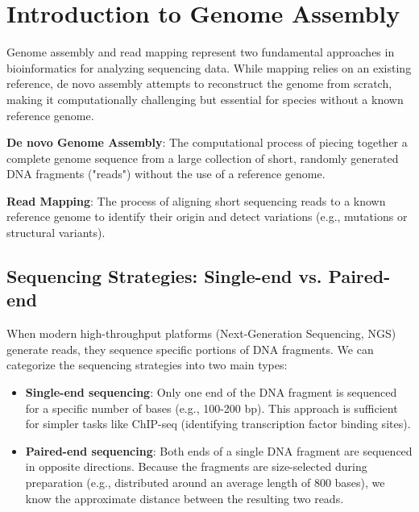 


\section{Introduction to Genome Assembly}
Genome assembly and read mapping represent two fundamental approaches in bioinformatics for analyzing sequencing data. While mapping relies on an existing reference, de novo assembly attempts to reconstruct the genome from scratch, making it computationally challenging but essential for species without a known reference genome. 

\begin{important}
    \textbf{De novo Genome Assembly}: The computational process of piecing together a complete genome sequence from a large collection of short, randomly generated DNA fragments ("reads") without the use of a reference genome.
\end{important}

\begin{important}
    \textbf{Read Mapping}: The process of aligning short sequencing reads to a known reference genome to identify their origin and detect variations (e.g., mutations or structural variants).
\end{important}

\subsection{Sequencing Strategies: Single-end vs. Paired-end}
When modern high-throughput platforms (Next-Generation Sequencing, NGS) generate reads, they sequence specific portions of DNA fragments. We can categorize the sequencing strategies into two main types:

\begin{itemize}
    \item \textbf{Single-end sequencing}: Only one end of the DNA fragment is sequenced for a specific number of bases (e.g., 100-200 bp). This approach is sufficient for simpler tasks like ChIP-seq (identifying transcription factor binding sites).
    \item \textbf{Paired-end sequencing}: Both ends of a single DNA fragment are sequenced in opposite directions. Because the fragments are size-selected during preparation (e.g., distributed around an average length of 800 bases), we know the approximate distance between the resulting two reads. 
\end{itemize}

